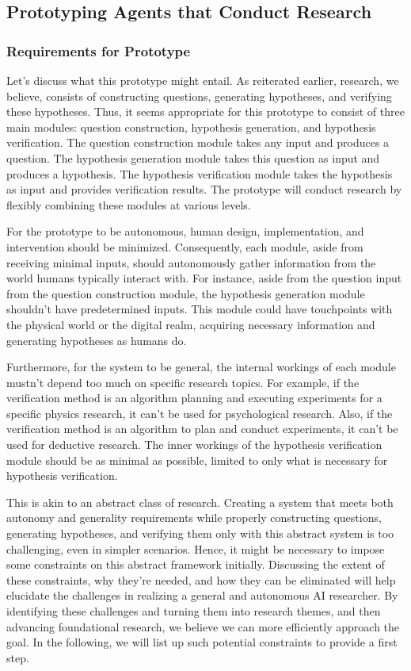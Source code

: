 \subsection{Prototyping Agents that Conduct Research}

\subsubsection{Requirements for Prototype}
Let's discuss what this prototype might entail. As reiterated earlier, research, we believe, consists of constructing questions, generating hypotheses, and verifying these hypotheses. Thus, it seems appropriate for this prototype to consist of three main modules: question construction, hypothesis generation, and hypothesis verification. The question construction module takes any input and produces a question. The hypothesis generation module takes this question as input and produces a hypothesis. The hypothesis verification module takes the hypothesis as input and provides verification results. The prototype will conduct research by flexibly combining these modules at various levels.

For the prototype to be autonomous, human design, implementation, and intervention should be minimized. Consequently, each module, aside from receiving minimal inputs, should autonomously gather information from the world humans typically interact with. For instance, aside from the question input from the question construction module, the hypothesis generation module shouldn't have predetermined inputs. This module could have touchpoints with the physical world or the digital realm, acquiring necessary information and generating hypotheses as humans do.

Furthermore, for the system to be general, the internal workings of each module mustn't depend too much on specific research topics. For example, if the verification method is an algorithm planning and executing experiments for a specific physics research, it can't be used for psychological research. Also, if the verification method is an algorithm to plan and conduct experiments, it can't be used for deductive research. The inner workings of the hypothesis verification module should be as minimal as possible, limited to only what is necessary for hypothesis verification. 

This is akin to an abstract class of research. Creating a system that meets both autonomy and generality requirements while properly constructing questions, generating hypotheses, and verifying them only with this abstract system is too challenging, even in simpler scenarios. Hence, it might be necessary to impose some constraints on this abstract framework initially. Discussing the extent of these constraints, why they're needed, and how they can be eliminated will help elucidate the challenges in realizing a general and  autonomous AI researcher. By identifying these challenges and turning them into research themes, and then advancing foundational research, we believe we can more efficiently approach the goal. In the following, we will list up such potential constraints to provide a first step.

